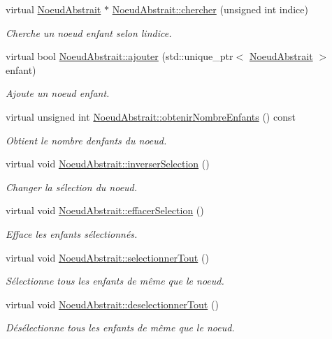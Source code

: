 \begin{DoxyCompactItemize}
virtual \hyperlink{class_noeud_abstrait}{Noeud\+Abstrait} $\ast$ \hyperlink{group__inf2990_ga13f7e9a637f7439b1a0cec0c49f6fa88}{Noeud\+Abstrait\+::chercher} (unsigned int indice)
\begin{DoxyCompactList}\small\item\em Cherche un noeud enfant selon l\textquotesingle{}indice. \end{DoxyCompactList}\item 
virtual bool \hyperlink{group__inf2990_ga7051399643afa57468ef07444a085a85}{Noeud\+Abstrait\+::ajouter} (std\+::unique\+\_\+ptr$<$ \hyperlink{class_noeud_abstrait}{Noeud\+Abstrait} $>$ enfant)
\begin{DoxyCompactList}\small\item\em Ajoute un noeud enfant. \end{DoxyCompactList}\item 
virtual unsigned int \hyperlink{group__inf2990_gad5a99959e905fc2d9f0fef16a02546a2}{Noeud\+Abstrait\+::obtenir\+Nombre\+Enfants} () const 
\begin{DoxyCompactList}\small\item\em Obtient le nombre d\textquotesingle{}enfants du noeud. \end{DoxyCompactList}\item 
virtual void \hyperlink{group__inf2990_ga2516eef94f98d4951baff6fd45020725}{Noeud\+Abstrait\+::inverser\+Selection} ()
\begin{DoxyCompactList}\small\item\em Changer la sélection du noeud. \end{DoxyCompactList}\item 
virtual void \hyperlink{group__inf2990_gaf6440c1b4ab6861f0ace6ba410c1fc84}{Noeud\+Abstrait\+::effacer\+Selection} ()
\begin{DoxyCompactList}\small\item\em Efface les enfants sélectionnés. \end{DoxyCompactList}\item 
virtual void \hyperlink{group__inf2990_gaa9b1fa06dad2695ea6870411c62652b3}{Noeud\+Abstrait\+::selectionner\+Tout} ()
\begin{DoxyCompactList}\small\item\em Sélectionne tous les enfants de même que le noeud. \end{DoxyCompactList}\item 
virtual void \hyperlink{group__inf2990_ga4f942bd122fc3402537ecac737c5248a}{Noeud\+Abstrait\+::deselectionner\+Tout} ()
\begin{DoxyCompactList}\small\item\em Désélectionne tous les enfants de même que le noeud. \end{DoxyCompactList}\item 

\end{DoxyCompactItemize}
